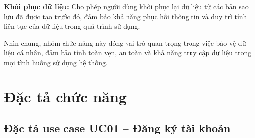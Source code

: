 \documentclass[../DoAn.tex]{subfiles}
\begin{document}
\textbf{Khôi phục dữ liệu:} Cho phép người dùng khôi phục lại dữ liệu từ các bản sao lưu đã được tạo trước đó, đảm bảo khả năng phục hồi thông tin và duy trì tính liên tục của dữ liệu trong quá trình sử dụng.

Nhìn chung, nhóm chức năng này đóng vai trò quan trọng trong việc bảo vệ dữ liệu cá nhân, đảm bảo tính toàn vẹn, an toàn và khả năng truy cập dữ liệu trong mọi tình huống sử dụng hệ thống.

\section{Đặc tả chức năng}
\label{section:2.3}

\subsection{Đặc tả use case UC01 -- Đăng ký tài khoản}
\end{document}
